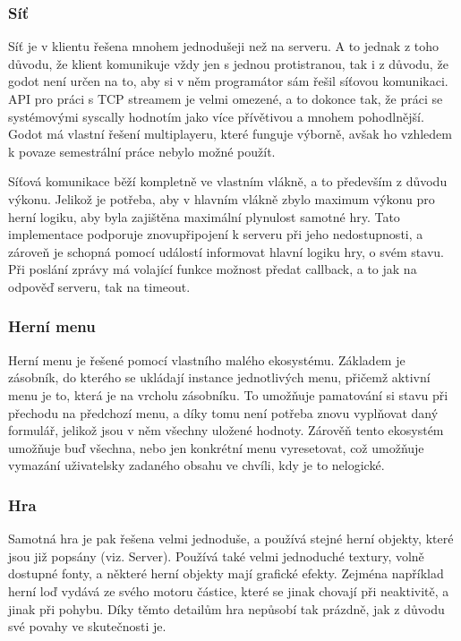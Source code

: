 \documentclass[12pt, a4paper]{article}
\begin{document}
    \subsubsection{Síť}
    Síť je v klientu řešena mnohem jednodušeji než na serveru.
    A to jednak z toho důvodu, že klient komunikuje vždy jen s jednou protistranou, tak i z důvodu, že godot není určen na to, aby si v něm programátor sám řešil síťovou komunikaci.
    API pro práci s TCP streamem je velmi omezené, a to dokonce tak, že práci se systémovými syscally hodnotím jako více přívětivou a mnohem pohodlnější.
    Godot má vlastní řešení multiplayeru, které funguje výborně, avšak ho vzhledem k povaze semestrální práce nebylo možné použít.

    Síťová komunikace běží kompletně ve vlastním vlákně, a to především z důvodu výkonu.
    Jelikož je potřeba, aby v hlavním vlákně zbylo maximum výkonu pro herní logiku, aby byla zajištěna maximální plynulost samotné hry.
    Tato implementace podporuje znovupřipojení k serveru při jeho nedostupnosti, a zároveň je schopná pomocí událostí informovat hlavní logiku hry, o svém stavu.
    Při poslání zprávy má volající funkce možnost předat callback, a to jak na odpověď serveru, tak na timeout.

    \subsubsection{Herní menu}
    Herní menu je řešené pomocí vlastního malého ekosystému.
    Základem je zásobník, do kterého se ukládají instance jednotlivých menu, přičemž aktivní menu je to, která je na vrcholu zásobníku.
    To umožňuje pamatování si stavu při přechodu na předchozí menu, a díky tomu není potřeba znovu vyplňovat daný formulář, jelikož jsou v něm všechny uložené hodnoty.
    Zárověň tento ekosystém umožňuje buď všechna, nebo jen konkrétní menu vyresetovat, což umožňuje vymazání uživatelsky zadaného obsahu ve chvíli, kdy je to nelogické.

    \subsubsection{Hra}
    Samotná hra je pak řešena velmi jednoduše, a používá stejné herní objekty, které jsou již popsány (viz. Server).
    Používá také velmi jednoduché textury, volně dostupné fonty, a některé herní objekty mají grafické efekty.
    Zejména například herní loď vydává ze svého motoru částice, které se jinak chovají při neaktivitě, a jinak při pohybu.
    Díky těmto detailům hra nepůsobí tak prázdně, jak z důvodu své povahy ve skutečnosti je.
\end{document}
